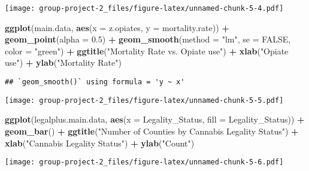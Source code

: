 \documentclass[
]{article}
\newenvironment{Shaded}{\begin{snugshade}}{\end{snugshade}}
\newcommand{\AttributeTok}[1]{\textcolor[rgb]{0.13,0.29,0.53}{#1}}
\newcommand{\ConstantTok}[1]{\textcolor[rgb]{0.56,0.35,0.01}{#1}}
\newcommand{\FloatTok}[1]{\textcolor[rgb]{0.00,0.00,0.81}{#1}}
\newcommand{\FunctionTok}[1]{\textcolor[rgb]{0.13,0.29,0.53}{\textbf{#1}}}
\newcommand{\NormalTok}[1]{#1}
\newcommand{\SpecialCharTok}[1]{\textcolor[rgb]{0.81,0.36,0.00}{\textbf{#1}}}
\newcommand{\StringTok}[1]{\textcolor[rgb]{0.31,0.60,0.02}{#1}}
\begin{document}
\texttt{[image: group-project-2\_files/figure-latex/unnamed-chunk-5-4.pdf]}

\begin{Shaded}
\begin{Highlighting}[]
\FunctionTok{ggplot}\NormalTok{(main.data, }\FunctionTok{aes}\NormalTok{(}\AttributeTok{x =}\NormalTok{ z.opiates, }\AttributeTok{y =}\NormalTok{ mortality.rate)) }\SpecialCharTok{+}
  \FunctionTok{geom\_point}\NormalTok{(}\AttributeTok{alpha =} \FloatTok{0.5}\NormalTok{) }\SpecialCharTok{+}
  \FunctionTok{geom\_smooth}\NormalTok{(}\AttributeTok{method =} \StringTok{"lm"}\NormalTok{, }\AttributeTok{se =} \ConstantTok{FALSE}\NormalTok{, }\AttributeTok{color =} \StringTok{"green"}\NormalTok{) }\SpecialCharTok{+}
  \FunctionTok{ggtitle}\NormalTok{(}\StringTok{"Mortality Rate vs. Opiate use"}\NormalTok{) }\SpecialCharTok{+}
  \FunctionTok{xlab}\NormalTok{(}\StringTok{"Opiate use"}\NormalTok{) }\SpecialCharTok{+}
  \FunctionTok{ylab}\NormalTok{(}\StringTok{"Mortality Rate"}\NormalTok{)}
\end{Highlighting}
\end{Shaded}

\begin{verbatim}
## `geom_smooth()` using formula = 'y ~ x'
\end{verbatim}

\texttt{[image: group-project-2\_files/figure-latex/unnamed-chunk-5-5.pdf]}

\begin{Shaded}
\begin{Highlighting}[]
\FunctionTok{ggplot}\NormalTok{(legalplus.main.data, }\FunctionTok{aes}\NormalTok{(}\AttributeTok{x =}\NormalTok{ Legality\_Status, }\AttributeTok{fill =}\NormalTok{ Legality\_Status)) }\SpecialCharTok{+}
  \FunctionTok{geom\_bar}\NormalTok{() }\SpecialCharTok{+}
  \FunctionTok{ggtitle}\NormalTok{(}\StringTok{"Number of Counties by Cannabis Legality Status"}\NormalTok{) }\SpecialCharTok{+}
  \FunctionTok{xlab}\NormalTok{(}\StringTok{"Cannabis Legality Status"}\NormalTok{) }\SpecialCharTok{+}
  \FunctionTok{ylab}\NormalTok{(}\StringTok{"Count"}\NormalTok{)}
\end{Highlighting}
\end{Shaded}

\texttt{[image: group-project-2\_files/figure-latex/unnamed-chunk-5-6.pdf]}
\end{document}
